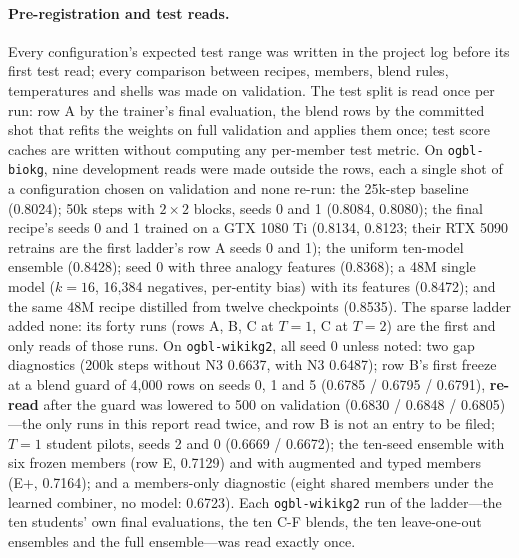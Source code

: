\documentclass[11pt,a4paper]{article}
\begin{document}
\paragraph{Pre-registration and test reads.}
Every configuration's expected test range was written in the project log
before its first test read; every comparison between recipes, members,
blend rules, temperatures and shells was made on validation. The test
split is read once per run: row A by the trainer's final evaluation, the
blend rows by the committed shot that refits the weights on full
validation and applies them once; test score caches are written without
computing any per-member test metric.
On \texttt{ogbl-biokg}, nine development reads were made outside the
rows, each a single shot of a configuration chosen on validation and none
re-run: the 25k-step baseline (0.8024); 50k steps with $2\times2$ blocks,
seeds 0 and 1 (0.8084, 0.8080); the final recipe's seeds 0 and 1 trained
on a GTX 1080 Ti (0.8134, 0.8123; their RTX 5090 retrains are the first
ladder's row A seeds 0 and 1); the uniform ten-model ensemble (0.8428);
seed 0 with three analogy features (0.8368); a 48M single model ($k=16$,
16{,}384 negatives, per-entity bias) with its features (0.8472); and the
same 48M recipe distilled from twelve checkpoints (0.8535). The sparse
ladder added none: its forty runs (rows A, B, C at $T=1$, C at $T=2$) are
the first and only reads of those runs.
On \texttt{ogbl-wikikg2}, all seed 0 unless noted: two gap diagnostics
(200k steps without N3 0.6637, with N3 0.6487); row B's first freeze at a
blend guard of 4{,}000 rows on seeds 0, 1 and 5 (0.6785 / 0.6795 /
0.6791), \textbf{re-read} after the guard was lowered to 500 on validation
(0.6830 / 0.6848 / 0.6805)---the only runs in this report read twice, and
row B is not an entry to be filed; $T=1$ student pilots, seeds 2 and 0
(0.6669 / 0.6672); the ten-seed ensemble with six frozen members (row E,
0.7129) and with augmented and typed members (E+, 0.7164); and a
members-only diagnostic (eight shared members under the learned combiner,
no model: 0.6723). Each \texttt{ogbl-wikikg2} run of the ladder---the ten
students' own final evaluations, the ten C-F blends, the ten leave-one-out
ensembles and the full ensemble---was read exactly once.
\end{document}
